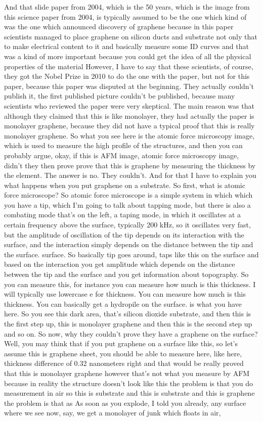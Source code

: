 And that slide paper from 2004, which is the 50 years, which is the image from this science paper from 2004, is typically assumed to be the one which kind of was the one which announced discovery of graphene because in this paper scientists managed to place graphene on silicon ducts and substrate not only that to make electrical content to it and basically measure some ID curves and that was a kind of more important because you could get the idea of all the physical properties of the material However, I have to say that these scientists, of course, they got the Nobel Prize in 2010 to do the one with the paper, but not for this paper, because this paper was disputed at the beginning. They actually couldn't publish it, the first published picture couldn't be published, because many scientists who reviewed the paper were very skeptical. The main reason was that although they claimed that this is like monolayer, they had actually the paper is monolayer graphene, because they did not have a typical proof that this is really monolayer graphene. So what you see here is the atomic force microscopy image, which is used to measure the high profile of the structures, and then you can probably argue, okay, if this is AFM image, atomic force microscopy image, didn't they then prove prove that this is graphene by measuring the thickness by the element. The answer is no. They couldn't. And for that I have to explain you what happens when you put graphene on a substrate. So first, what is atomic force microscope? So atomic force microscope is a simple system in which which you have a tip, which I'm going to talk about tapping mode, but there is also a combating mode that's on the left, a taping mode, in which it oscillates at a certain frequency above the surface, typically 200 kHz, so it oscillates very fast, but the amplitude of oscillation of the tip depends on its interaction with the surface, and the interaction simply depends on the distance between the tip and the surface. surface. So basically tip goes around, taps like this on the surface and based on the interaction you get amplitude which depends on the distance between the tip and the surface and you get information about topography. So you can measure this, for instance you can measure how much is this thickness. I will typically use lowercase e for thickness. You can measure how much is this thickness. You can basically get a hydropile on the surface. is what you have here. So you see this dark area, that's silicon dioxide substrate, and then this is the first step up, this is monolayer graphene and then this is the second step up and so on. So now, why they couldn't prove they have a graphene on the surface? Well, you may think that if you put graphene on a surface like this, so let's assume this is graphene sheet, you should be able to measure here, like here, thickness difference of 0.32 nanometers right and that would be really proved that this is monolayer graphene however that's not what you measure by AFM because in reality the structure doesn't look like this the problem is that you do measurement in air so this is substrate and this is substrate and this is graphene the problem is that as As soon as you explode, I told you already, any surface where we see now, say, we get a monolayer of junk which floats in air, 
